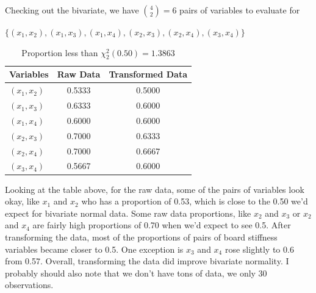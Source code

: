 Checking out the bivariate, we have ${4 \choose 2} = 6$ pairs of variables to evaluate for

$\{(x_{1}, x_{2}), (x_{1}, x_{3}), (x_{1}, x_{4}), (x_{2}, x_{3}), (x_{2}, x_{4}), (x_{3}, x_{4})\}$

\begin{table}[H]
    \caption*{Proportion less than $\chi_{2}^{2}(0.50) = 1.3863$}
    \centering
    \begin{tabular}{lcc}
        \hline %
        Variables & Raw Data & Transformed Data \\
        \hline %
        $(x_{1}, x_{2})$ & 0.5333 &    0.5000 \\
        $(x_{1}, x_{3})$ & 0.6333 &    0.6000 \\
        $(x_{1}, x_{4})$ & 0.6000 &    0.6000 \\
        $(x_{2}, x_{3})$ & 0.7000 &    0.6333 \\
        $(x_{2}, x_{4})$ & 0.7000 &    0.6667 \\
        $(x_{3}, x_{4})$ & 0.5667 &    0.6000 \\
        \hline %
    \end{tabular}
\end{table}

Looking at the table above, for the raw data, some of the pairs of variables look okay, like $x_{1}$ and $x_{2}$ who has a proportion of 0.53, which is close to the 0.50 we'd expect for bivariate normal data. Some raw data proportions, like $x_{2}$ and $x_{3}$ or $x_{2}$ and $x_{4}$ are fairly high proportions of 0.70 when we'd expect to see 0.5. After transforming the data, most of the proportions of pairs of board stiffness variables became closer to 0.5. One exception is $x_{3}$ and $x_{4}$ rose slightly to 0.6 from 0.57. Overall, transforming the data did improve bivariate normality. I probably should also note that we don't have tons of data, we only 30 observations.
